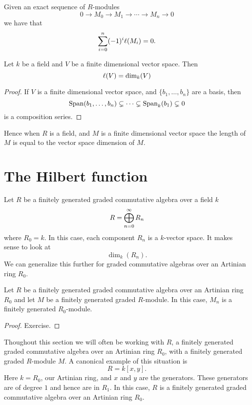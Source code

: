 \documentclass{ximera}
\begin{document}
\begin{corollary}\label{C:Lles}
  Given an exact sequence of $R$-modules
  \[
  0 \to M_0\to M_1\to \cdots \to M_n \to 0
  \]
  we have that
  \[
  \sum_{i=0}^n (-1)^i \ell(M_i) = 0.
  \]
\end{corollary}



\begin{proposition}
  Let $k$ be a field and $V$ be a finite dimensional vector
  space. Then
  \[
  \ell(V) = \dim_k(V)
  \]
  \begin{proof}
    If $V$ is a finite dimensional vector space, and
    $\{b_1,\dots,b_n\}$ are a basis, then
    \[
    \operatorname{Span}(b_1,\dots,b_n) \subsetneq \dots \subsetneq \operatorname{Span}_k(b_1) \subsetneq 0
    \]
    is a composition series.
  \end{proof}
\end{proposition}


Hence when $R$ is a field, and $M$ is a finite dimensional vector
space the length of $M$ is equal to the vector space dimension of $M$.




\section{The Hilbert function}

Let $R$ be a finitely generated graded commutative algebra over a
field $k$
\[
R = \bigoplus_{n=0}^\infty R_n
\]
where $R_0 = k$.  In this case, each component $R_n$ is a $k$-vector
space. It makes sense to look at
\[
\dim_k(R_n).
\]
We can generalize this further for graded commutative algebras over an
Artinian ring $R_0$.



\begin{lemma}
  Let $R$ be a finitely generated graded commutative algebra over an
  Artinian ring $R_0$ and let $M$ be a finitely generated graded
  $R$-module.  In this case, $M_n$ is a finitely generated
  $R_0$-module.
  \begin{proof}
    Exercise.
  \end{proof}
\end{lemma}


Thoughout this section we will often be working with $R$, a finitely
generated graded commutative algebra over an Artinian ring $R_0$, with
a finitely generated graded $R$-module $M$. A canonical example of
this situation is
\[
R = k[x,y].
\]
Here $k = R_0$, our Artinian ring, and $x$ and $y$ are the
generators. These generators are of degree $1$ and hence are in
$R_1$. In this case, $R$ is a finitely generated graded commutative
algebra over an Artinian ring $R_0$.
\end{document}
